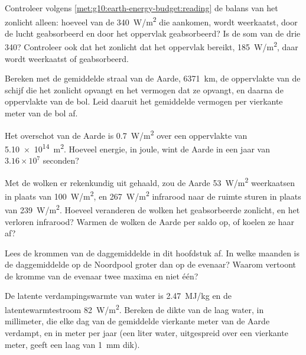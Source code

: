 \begin{exercise}[$\star\star$]\label{exo:g10:earth-energy-budget:7}
Controleer volgens \cref{met:g10:earth-energy-budget:reading} de balans van het
zonlicht alleen: hoeveel van de \qty{340}{W/m^2} die aankomen, wordt
weerkaatst, door de lucht geabsorbeerd en door het oppervlak geabsorbeerd? Is
de som van de drie 340? Controleer ook dat het zonlicht dat het oppervlak
bereikt, \qty{185}{W/m^2}, daar wordt weerkaatst of geabsorbeerd.
\end{exercise}

\begin{exercise}[$\star\star$]\label{exo:g10:earth-energy-budget:8}
Bereken met de gemiddelde straal van de Aarde, \qty{6371}{km}, de oppervlakte
van de schijf die het zonlicht opvangt en het vermogen dat ze opvangt, en daarna
de oppervlakte van de bol. Leid daaruit het gemiddelde vermogen per vierkante
meter van de bol af.
\end{exercise}

\begin{exercise}[$\star\star$]\label{exo:g10:earth-energy-budget:9}
Het overschot van de Aarde is \qty{0.7}{W/m^2} over een oppervlakte van
\qty{5.10e14}{m^2}. Hoeveel energie, in joule, wint de Aarde in een jaar van
$3.16\times10^7$ seconden?
\end{exercise}

\begin{exercise}[$\star\star$]\label{exo:g10:earth-energy-budget:10}
Met de wolken er rekenkundig uit gehaald, zou de Aarde \qty{53}{W/m^2}
weerkaatsen in plaats van \qty{100}{W/m^2}, en \qty{267}{W/m^2} infrarood naar
de ruimte sturen in plaats van \qty{239}{W/m^2}. Hoeveel veranderen de wolken
het geabsorbeerde zonlicht, en het verloren infrarood? Warmen de wolken de Aarde
per saldo op, of koelen ze haar af?
\end{exercise}

\begin{exercise}[$\star\star$]\label{exo:g10:earth-energy-budget:11}
Lees de krommen van de daggemiddelde  in dit hoofdstuk af. In welke
maanden is de daggemiddelde  op de Noordpool groter dan op de evenaar?
Waarom vertoont de kromme van de evenaar twee maxima en niet één?
\end{exercise}

\begin{exercise}[$\star\star\star$]\label{exo:g10:earth-energy-budget:12}
De latente verdampingswarmte van water is \qty{2.47}{MJ/kg} en de
latentewarmtestroom \qty{82}{W/m^2}. Bereken de dikte van de laag water, in
millimeter, die elke dag van de gemiddelde vierkante meter van de Aarde
verdampt, en in meter per jaar (een liter water, uitgespreid over een vierkante
meter, geeft een laag van \qty{1}{mm} dik).
\end{exercise}


